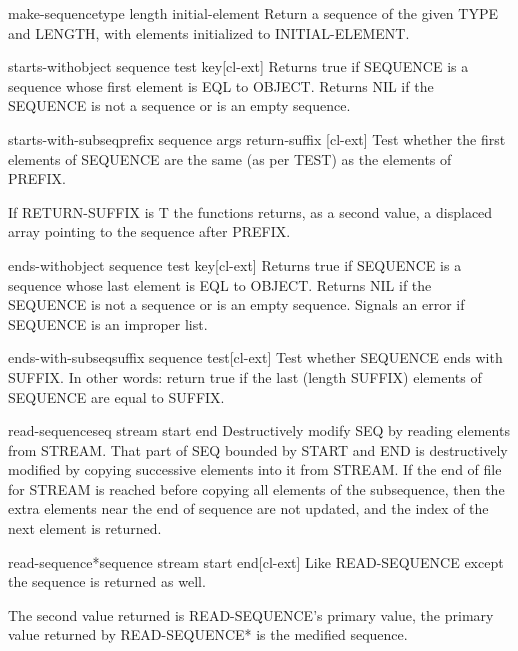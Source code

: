 \documentclass[10pt,english]{book}
\begin{document}
\begin{function}{make-sequence}{type length \key initial-element}
  Return a sequence of the given TYPE and LENGTH, with elements initialized
  to INITIAL-ELEMENT.
\end{function}

\begin{function}{starts-with}{object sequence \key test key}[cl-ext]
  Returns true if SEQUENCE is a sequence whose first element is EQL to OBJECT.
  Returns NIL if the SEQUENCE is not a sequence or is an empty sequence.
\end{function}

\begin{function}{starts-with-subseq}{prefix sequence \rest args \key return-suffix \akeys}[cl-ext]
  Test whether the first elements of SEQUENCE are the same (as per TEST) as the elements of PREFIX.

  If RETURN-SUFFIX is T the functions returns, as a second value, a
  displaced array pointing to the sequence after PREFIX.
\end{function}

\begin{function}{ends-with}{object sequence \key test key}[cl-ext]
  Returns true if SEQUENCE is a sequence whose last element is EQL to OBJECT.
  Returns NIL if the SEQUENCE is not a sequence or is an empty sequence. Signals
  an error if SEQUENCE is an improper list.
\end{function}

\begin{function}{ends-with-subseq}{suffix sequence \key test}[cl-ext]
  Test whether SEQUENCE ends with SUFFIX. In other words: return true if
  the last (length SUFFIX) elements of SEQUENCE are equal to SUFFIX.
\end{function}

\begin{function}{read-sequence}{seq stream \key start end}
  Destructively modify SEQ by reading elements from STREAM.
  That part of SEQ bounded by START and END is destructively modified by
  copying successive elements into it from STREAM. If the end of file
  for STREAM is reached before copying all elements of the subsequence,
  then the extra elements near the end of sequence are not updated, and
  the index of the next element is returned.
\end{function}

\begin{function}{read-sequence*}{sequence stream \key start end}[cl-ext]
  Like READ-SEQUENCE except the sequence is returned as well.

  The second value returned is READ-SEQUENCE's primary value, the
  primary value returned by READ-SEQUENCE* is the medified
  sequence.
\end{function}
\end{document}
